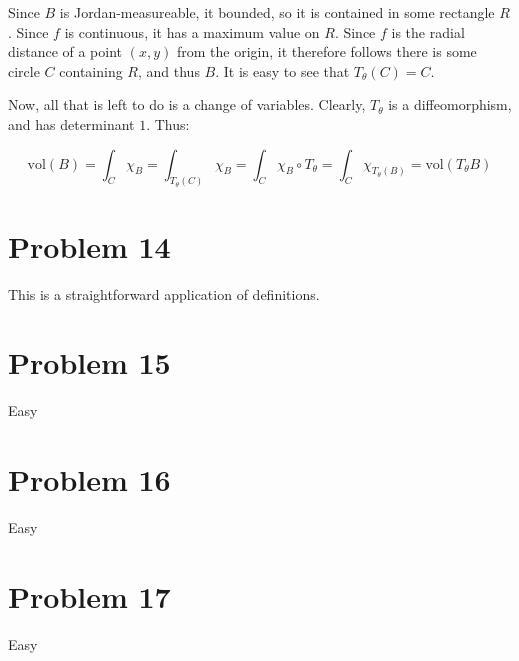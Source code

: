 \documentclass[10pt, oneside]{amsart}
\begin{document}
    Since $B$ is Jordan-measureable, it bounded, so it is contained in some rectangle $R$. Since $f$ is continuous, it has a maximum value on $R$. Since $f$ is the radial distance of a point $(x, y)$ from the
    origin, it therefore follows there is some circle $C$ containing $R$, and thus $B$. It is easy to see that $T_{\theta}(C) = C$.
    \newline

    Now, all that is left to do is a change of variables. Clearly, $T_{\theta}$ is a diffeomorphism, and has determinant $1$. Thus:

    $$\text{vol}(B) = \displaystyle\int_{C} \chi_{B} = \displaystyle\int_{T_{\theta}(C)} \chi_{B} = \displaystyle\int_{C} \chi_B \circ T_{\theta} = \displaystyle\int_{C} \chi_{T_{\theta}(B)} = \text{vol}(T_{\theta} B)$$

    \hrulefill

    \section{Problem 14}

    This is a straightforward application of definitions.

    \hrulefill

    \section{Problem 15}

    Easy

    \hrulefill

    \section{Problem 16}

    Easy

    \hrulefill

    \section{Problem 17}

    Easy

    \hrulefill


    
\end{document}
